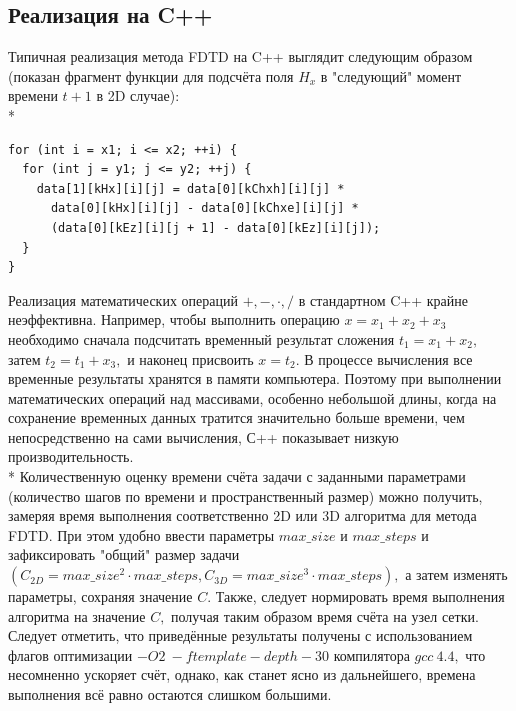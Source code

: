 \documentclass[10pt]{article}
\begin{document}
\subsection{Реализация на C++}
Типичная реализация метода FDTD на C++ выглядит следующим образом
(показан фрагмент функции для подсчёта поля $H_x$ в "следующий"
момент времени $t+1$ в 2D случае):\\*
\begin{verbatim}
for (int i = x1; i <= x2; ++i) {
  for (int j = y1; j <= y2; ++j) {
    data[1][kHx][i][j] = data[0][kChxh][i][j] *
      data[0][kHx][i][j] - data[0][kChxe][i][j] *
      (data[0][kEz][i][j + 1] - data[0][kEz][i][j]);
  }
}
\end{verbatim}
Реализация математических операций $+,-,\cdot,/$ в стандартном C++ крайне
неэффективна. Например, чтобы выполнить операцию $x=x_1+x_2+x_3$ необходимо
сначала подсчитать временный результат сложения $t_1=x_1+x_2,$ затем 
$t_2=t_1+x_3,$ и наконец присвоить $x=t_2$. В процессе вычисления все временные
результаты хранятся в памяти компьютера. Поэтому при выполнении математических
операций над массивами, особенно небольшой длины, когда на сохранение временных
данных тратится значительно больше времени, чем непосредственно на сами 
вычисления, С++ показывает низкую производительность.\\*
Количественную оценку времени счёта задачи с заданными параметрами
(количество шагов по времени и пространственный размер) можно получить,
замеряя время выполнения соответственно 2D или 3D алгоритма для метода FDTD. При
этом удобно ввести параметры $max\_size$ и $max\_steps$ и зафиксировать "общий" 
размер задачи $\left(C_{2D} = max\_size^2 \cdot max\_steps,C_{3D} = max\_size^3 
\cdot max\_steps \right),$ а затем изменять параметры, сохраняя значение $C.$
Также, следует нормировать время выполнения алгоритма на значение $C,$ получая
таким образом время счёта на узел сетки.
Следует отметить, что приведённые результаты получены с использованием флагов
оптимизации $-O2~-ftemplate-depth-30$ компилятора $gcc~4.4,$ что несомненно 
ускоряет счёт, однако, как станет ясно из дальнейшего, времена выполнения 
всё равно остаются слишком большими.
\end{document}
